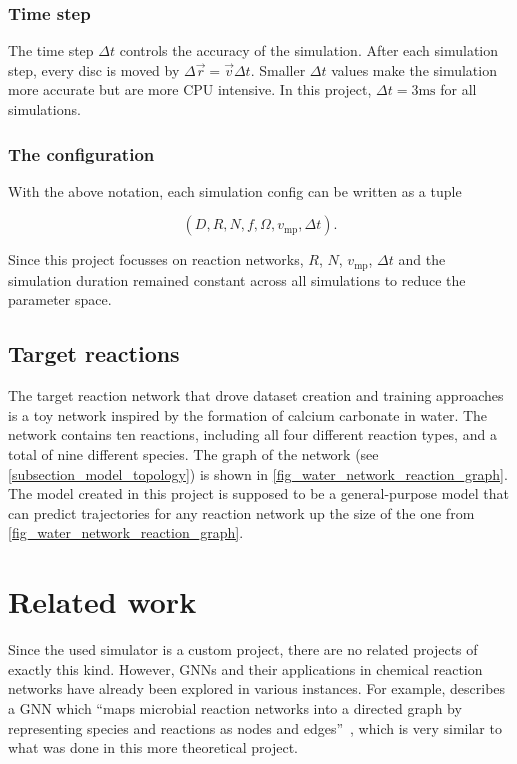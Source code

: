 \documentclass[a4paper]{scrartcl}
\begin{document}
\subsubsection*{Time step}
The time step $\Delta t$ controls the accuracy of the simulation. After each simulation step, every disc is moved by $\Delta \vec{r} = \vec{v}\Delta t$. Smaller $\Delta t$ values make the simulation more accurate but are more CPU intensive. In this project, $\Delta t = 3\text{ms}$ for all simulations.

\subsubsection*{The configuration}
With the above notation, each simulation config can be written as a tuple

\begin{equation*}
    (D, R, N, f, \Omega, v_{\text{mp}}, \Delta t).
\end{equation*}

Since this project focusses on reaction networks, $R$, $N$, $v_\text{mp}$, $\Delta t$ and the simulation duration remained constant across all simulations to reduce the parameter space.

\subsection{Target reactions}
The target reaction network that drove dataset creation and training approaches is a toy network inspired by the formation of calcium carbonate in water. The network contains ten reactions, including all four different reaction types, and a total of nine different species. The graph of the network (see \cref{subsection_model_topology}) is shown in \cref{fig_water_network_reaction_graph}. The model created in this project is supposed to be a general-purpose model that can predict trajectories for any reaction network up the size of the one from \cref{fig_water_network_reaction_graph}.

\section{Related work}
Since the used simulator is a custom project, there are no related projects of exactly this kind. However, GNNs and their applications in chemical reaction networks have already been explored in various instances. For example, \cite{phygnet} describes a GNN which \enquote{maps microbial reaction networks into a directed graph by representing species and reactions as nodes and edges}~\cite{phygnet_website}, which is very similar to what was done in this more theoretical project.
\end{document}
